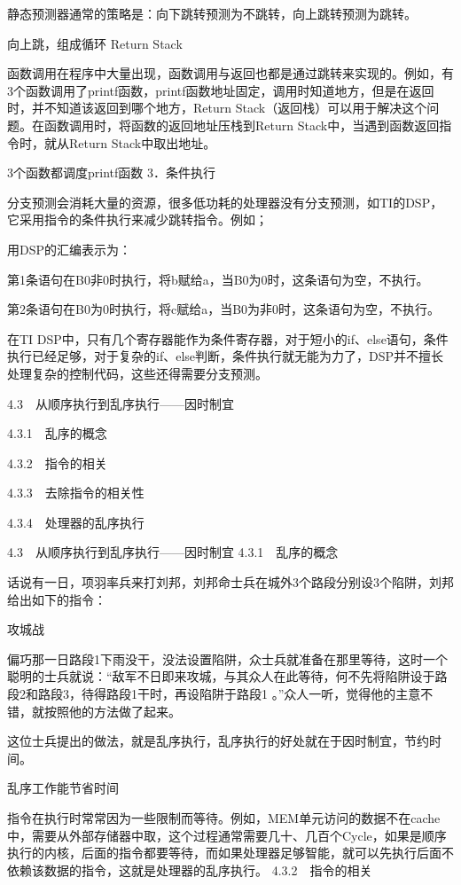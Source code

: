 \documentclass[12pt,UTF8]{ctexbook}
\begin{document}
静态预测器通常的策略是：向下跳转预测为不跳转，向上跳转预测为跳转。

向上跳，组成循环
Return Stack

函数调用在程序中大量出现，函数调用与返回也都是通过跳转来实现的。例如，有3个函数调用了printf函数，printf函数地址固定，调用时知道地方，但是在返回时，并不知道该返回到哪个地方，Return Stack（返回栈）可以用于解决这个问题。在函数调用时，将函数的返回地址压栈到Return Stack中，当遇到函数返回指令时，就从Return Stack中取出地址。

3个函数都调度printf函数
3．条件执行

分支预测会消耗大量的资源，很多低功耗的处理器没有分支预测，如TI的DSP，它采用指令的条件执行来减少跳转指令。例如；

用DSP的汇编表示为：

第1条语句在B0非0时执行，将b赋给a，当B0为0时，这条语句为空，不执行。

第2条语句在B0为0时执行，将c赋给a，当B0为非0时，这条语句为空，不执行。

在TI DSP中，只有几个寄存器能作为条件寄存器，对于短小的if、else语句，条件执行已经足够，对于复杂的if、else判断，条件执行就无能为力了，DSP并不擅长处理复杂的控制代码，这些还得需要分支预测。


4.3　从顺序执行到乱序执行——因时制宜

4.3.1　乱序的概念

4.3.2　指令的相关

4.3.3　去除指令的相关性

4.3.4　处理器的乱序执行


4.3　从顺序执行到乱序执行——因时制宜
4.3.1　乱序的概念

话说有一日，项羽率兵来打刘邦，刘邦命士兵在城外3个路段分别设3个陷阱，刘邦给出如下的指令：

攻城战

偏巧那一日路段1下雨没干，没法设置陷阱，众士兵就准备在那里等待，这时一个聪明的士兵就说：“敌军不日即来攻城，与其众人在此等待，何不先将陷阱设于路段2和路段3，待得路段1干时，再设陷阱于路段1 。”众人一听，觉得他的主意不错，就按照他的方法做了起来。

这位士兵提出的做法，就是乱序执行，乱序执行的好处就在于因时制宜，节约时间。

乱序工作能节省时间

指令在执行时常常因为一些限制而等待。例如，MEM单元访问的数据不在cache中，需要从外部存储器中取，这个过程通常需要几十、几百个Cycle，如果是顺序执行的内核，后面的指令都要等待，而如果处理器足够智能，就可以先执行后面不依赖该数据的指令，这就是处理器的乱序执行。
4.3.2　指令的相关
\end{document}
